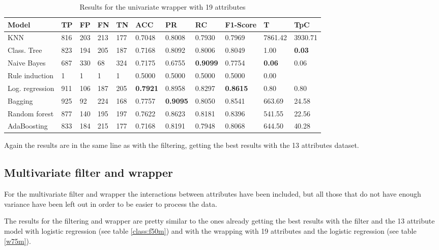 \documentclass[a4paper,11pt]{article}
\begin{document}
\begin{table}
\centering
\begin{tabular}{|l|l|l|l|l|l|l|l|l|l|l|}
\hline

\textbf{Model} & \textbf{TP} & \textbf{FP} & \textbf{FN} & \textbf{TN} & \textbf{ACC} & \textbf{PR} & \textbf{RC} & \textbf{F1-Score} & \textbf{T} & \textbf{TpC} \\ \hline
KNN & 816 & 203 & 213 & 177 & 0.7048 & 0.8008 & 0.7930 & 0.7969 & 7861.42 & 3930.71 \\ \hline
Class. Tree & 823 & 194 & 205 & 187 & 0.7168 & 0.8092 & 0.8006 & 0.8049 & 1.00 & \textbf{0.03} \\ \hline
Naive Bayes & 687 & 330 & 68 & 324 & 0.7175 & 0.6755 & \textbf{0.9099} & 0.7754 & \textbf{0.06} & 0.06 \\ \hline
Rule induction & 1 & 1 & 1 & 1 & 0.5000 & 0.5000 & 0.5000 & 0.5000 & 0.00 \\ \hline
Log. regression & 911 & 106 & 187 & 205 & \textbf{0.7921} & 0.8958 & 0.8297 & \textbf{0.8615} & 0.80 & 0.80 \\ \hline
Bagging & 925 & 92 & 224 & 168 & 0.7757 & \textbf{0.9095} & 0.8050 & 0.8541 & 663.69 & 24.58 \\ \hline
Random forest & 877 & 140 & 195 & 197 & 0.7622 & 0.8623 & 0.8181 & 0.8396 & 541.55 & 22.56 \\ \hline
AdaBoosting & 833 & 184 & 215 & 177 & 0.7168 & 0.8191 & 0.7948 & 0.8068 & 644.50 & 40.28 \\ \hline

\end{tabular}
\caption{Results for the univariate wrapper with 19 attributes}
\label{class:w75u}
\end{table}

Again the results are in the same line as with the filtering, getting the best results with the 13 attributes dataset.

\subsection{Multivariate filter and wrapper}

For the multivariate filter and wrapper the interactions between attributes have been included, but all those that do not have enough variance have been left out in order to be easier to process the data.

The results for the filtering and wrapper are pretty similar to the ones already  getting the best results with the filter and the 13 attribute model with logistic regression (see table \ref{class:f50m}) and with the wrapping with 19 attributes and the logistic regression (see table \ref{w75m}).
\end{document}
